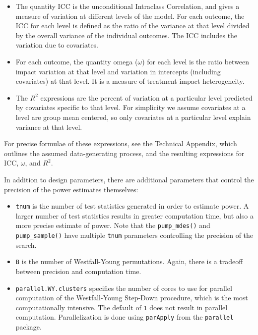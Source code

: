 \documentclass{article}
\providecommand{\tightlist}{%
  \setlength{\itemsep}{0pt}\setlength{\parskip}{0pt}}
\begin{document}
\begin{itemize}
\item
  The quantity \(\text{ICC}\) is the unconditional Intraclass
  Correlation, and gives a measure of variation at different levels of
  the model. For each outcome, the ICC for each level is defined as the
  ratio of the variance at that level divided by the overall variance of
  the individual outcomes. The ICC includes the variation due to
  covariates.
\item
  For each outcome, the quantity omega (\(\omega\)) for each level is
  the ratio between impact variation at that level and variation in
  intercepts (including covariates) at that level. It is a measure of
  treatment impact heterogeneity.
\item
  The \(R^2\) expressions are the percent of variation at a particular
  level predicted by covariates specific to that level. For simplicity
  we assume covariates at a level are group mean centered, so only
  covariates at a particular level explain variance at that level.
\end{itemize}

For precise formulae of these expressions, see the Technical Appendix,
which outlines the assumed data-generating process, and the resulting
expressions for \(\text{ICC}\), \(\omega\), and \(R^2\).

In addition to design parameters, there are additional parameters that
control the precision of the power estimates themselves:

\begin{itemize}
\tightlist
\item
  \texttt{tnum} is the number of test statistics generated in order to
  estimate power. A larger number of test statistics results in greater
  computation time, but also a more precise estimate of power. Note that
  the \texttt{pump\_mdes()} and \texttt{pump\_sample()} have multiple
  \texttt{tnum} parameters controlling the precision of the search.
\item
  \texttt{B} is the number of Westfall-Young permutations. Again, there
  is a tradeoff between precision and computation time.
\item
  \texttt{parallel.WY.clusters} specifies the number of cores to use for
  parallel computation of the Westfall-Young Step-Down procedure, which
  is the most computationally intensive. The default of \texttt{1} does
  not result in parallel computation. Parallelization is done using
  \texttt{parApply} from the \texttt{parallel} package.
\end{itemize}
\end{document}
